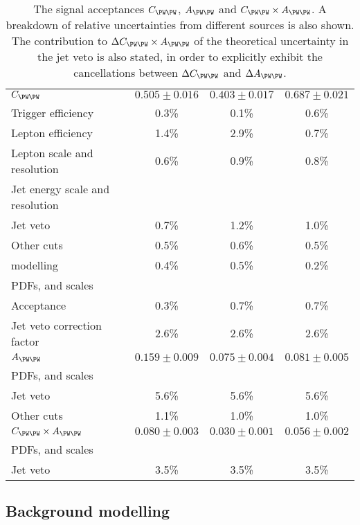 \begin{table}
	\begin{tabular}{lc@{\hskip 0.3in}c@{\hskip 0.3in}c}
		\toprule
		& \emch & \eech & \mmch \\
		\midrule
		$C_{\WW}$ & $0.505\pm0.016$ & $0.403\pm0.017$ & $0.687\pm0.021$ \\
		\quad Trigger efficiency & 0.3\% & 0.1\% & 0.6\% \\
		\quad Lepton efficiency  & 1.4\% & 2.9\% & 0.7\% \\
		\quad Lepton \pt scale and resolution & 0.6\% & 0.9\% & 0.8\% \\
		\quad Jet energy scale and resolution \\
		\quad\quad Jet veto   & 0.7\% & 1.2\% & 1.0\% \\
		\quad\quad Other cuts & 0.5\% & 0.6\% & 0.5\% \\
		\quad \met modelling  & 0.4\% & 0.5\% & 0.2\% \\
		\quad PDFs, \mur and \muf scales \\
		\quad\quad Acceptance & 0.3\% & 0.7\% & 0.7\% \\
		\quad\quad Jet veto correction factor & 2.6\% & 2.6\% & 2.6\% \\
		\midrule
		$A_{\WW}$ & $0.159\pm0.009$ & $0.075\pm0.004$ & $0.081\pm0.005$ \\
		\quad PDFs, \mur and \muf scales \\
		\quad\quad Jet veto   & 5.6\% & 5.6\% & 5.6\% \\
		\quad\quad Other cuts & 1.1\% & 1.0\% & 1.0\% \\
		\midrule
		$C_{\WW} \times A_{\WW}$ & $0.080\pm0.003$ & $0.030\pm0.001$ & $0.056\pm0.002$ \\
		\quad PDFs, \mur and \muf scales \\
		\quad\quad Jet veto   & 3.5\% & 3.5\% & 3.5\% \\
		\bottomrule
	\end{tabular}
	\caption{The signal acceptances $C_{\WW}$, $A_{\WW}$ and $C_{\WW} \times A_{\WW}$. 
	A breakdown of relative uncertainties from different sources is also shown. The 
	contribution to $\Delta C_{\WW} \times A_{\WW}$ of the theoretical uncertainty in the 
	jet veto is also stated, in order to explicitly exhibit the cancellations between 
	$\Delta C_{\WW}$ and $\Delta A_{\WW}$.}
	\label{tab:ww:cww_aww}
\end{table}



\subsection{Background modelling}
\label{sec:ww:bkg}

